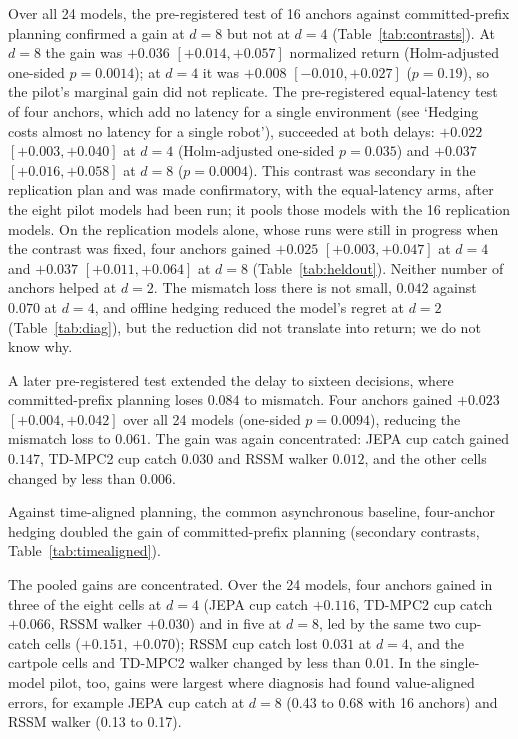\documentclass[aps,physrev,\manuscriptlayout,superscriptaddress,
  longbibliography,amsmath,amssymb]{revtex4-2}
\begin{document}
Over all 24 models, the pre-registered test of 16 anchors against committed-prefix planning confirmed a gain at $d=8$ but not at $d=4$ (Table~\ref{tab:contrasts}). At $d=8$ the gain was $+0.036$ $[+0.014, +0.057]$ normalized return (Holm-adjusted one-sided $p=0.0014$); at $d=4$ it was $+0.008$ $[-0.010, +0.027]$ ($p=0.19$), so the pilot's marginal gain did not replicate. The pre-registered equal-latency test of four anchors, which add no latency for a single environment (see `Hedging costs almost no latency for a single robot'), succeeded at both delays: $+0.022$ $[+0.003, +0.040]$ at $d=4$ (Holm-adjusted one-sided $p=0.035$) and $+0.037$ $[+0.016, +0.058]$ at $d=8$ ($p=0.0004$). This contrast was secondary in the replication plan and was made confirmatory, with the equal-latency arms, after the eight pilot models had been run; it pools those models with the 16 replication models. On the replication models alone, whose runs were still in progress when the contrast was fixed, four anchors gained $+0.025$ $[+0.003, +0.047]$ at $d=4$ and $+0.037$ $[+0.011, +0.064]$ at $d=8$ (Table~\ref{tab:heldout}). Neither number of anchors helped at $d=2$. The mismatch loss there is not small, $0.042$ against $0.070$ at $d=4$, and offline hedging reduced the model's regret at $d=2$ (Table~\ref{tab:diag}), but the reduction did not translate into return; we do not know why.

A later pre-registered test extended the delay to sixteen decisions, where committed-prefix planning loses $0.084$ to mismatch. Four anchors gained $+0.023$ $[+0.004, +0.042]$ over all 24 models (one-sided $p=0.0094$), reducing the mismatch loss to $0.061$. The gain was again concentrated: JEPA cup catch gained $0.147$, TD-MPC2 cup catch $0.030$ and RSSM walker $0.012$, and the other cells changed by less than $0.006$.

Against time-aligned planning, the common asynchronous baseline, four-anchor hedging doubled the gain of committed-prefix planning (secondary contrasts, Table~\ref{tab:timealigned}).

The pooled gains are concentrated. Over the 24 models, four anchors gained in three of the eight cells at $d=4$ (JEPA cup catch $+0.116$, TD-MPC2 cup catch $+0.066$, RSSM walker $+0.030$) and in five at $d=8$, led by the same two cup-catch cells ($+0.151$, $+0.070$); RSSM cup catch lost $0.031$ at $d=4$, and the cartpole cells and TD-MPC2 walker changed by less than $0.01$. In the single-model pilot, too, gains were largest where diagnosis had found value-aligned errors, for example JEPA cup catch at $d=8$ (0.43 to 0.68 with 16 anchors) and RSSM walker (0.13 to 0.17).
\end{document}
